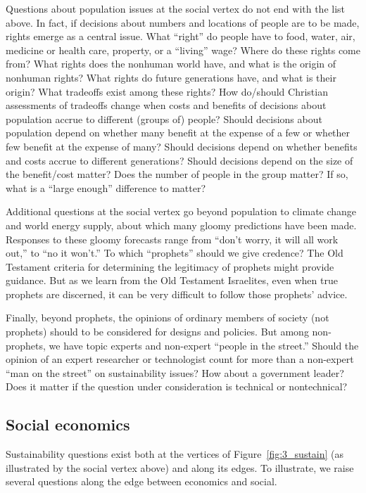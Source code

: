 \documentclass[12pt]{article}
\begin{document}
Questions about population issues 
at the social vertex do not end with the list above.
In fact, if decisions about numbers and locations of people are to be made,
rights emerge as a central issue.
What ``right'' do people have to food, water, air, medicine or health care, property, or a ``living'' wage? 
Where do these rights come from? 
What rights does the nonhuman world have, and what is the origin of nonhuman rights?
What rights do future generations have, and what is their origin?
What tradeoffs exist among these rights?
How do/should Christian assessments of tradeoffs change when costs and benefits
of decisions about population accrue to different (groups of) people?
Should decisions about population depend on whether many benefit at the expense of a few or
whether few benefit at the expense of many? 
Should decisions depend on whether benefits and costs accrue to different generations? 
Should decisions depend on the size of the benefit/cost matter? 
Does the number of people in the group matter? 
If so, what is a ``large enough'' difference to matter?

Additional questions at the social vertex go beyond population
to climate change and world energy supply, 
about which many gloomy predictions have been made.
Responses to these gloomy forecasts range from 
``don't worry, it will all work out,'' to ``no it won't.'' 
To which ``prophets'' should we give credence?  
The Old Testament criteria for determining the legitimacy of prophets might provide guidance.
But as we learn from the Old Testament Israelites, even when true prophets are discerned,
it can be very difficult to follow those prophets' advice. 

Finally, beyond prophets, the opinions of ordinary members of society (not prophets) 
should to be considered for designs and policies. 
But among non-prophets, we have topic experts and non-expert ``people in the street.''
Should the opinion of an expert researcher or technologist count for more 
than a non-expert ``man on the street'' on sustainability issues?
How about a government leader? 
Does it matter if the question under consideration is technical or nontechnical?


\subsection{Social economics}
\label{sec:social_economics}

Sustainability questions exist both at the vertices of Figure~\ref{fig:3_sustain}
(as illustrated by the social vertex above) 
and along its edges.
To illustrate, we raise several questions along the edge between economics and social.
\end{document}
